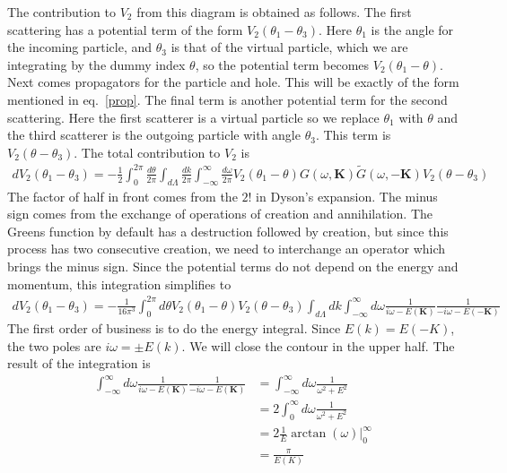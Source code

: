 \documentclass[14pt]{extarticle}
\begin{document}
The contribution to \(V_2\) from this diagram is obtained as follows. The first scattering has a potential term of the form \(V_2(\theta_1 - \theta_3)\). Here \(\theta_1\) is the angle for the incoming particle, and \(\theta_3\) is that of the virtual particle, which we are integrating by the dummy index \(\theta\), so the potential term becomes \(V_2(\theta_1 - \theta)\). Next comes propagators for the particle and hole. This will be exactly of the form mentioned in eq.~\ref{prop}. The final term is another potential term for the second scattering. Here the first scatterer is a virtual particle so we replace \(\theta_1\) with \(\theta\) and the third scatterer is the outgoing particle with angle \(\theta_3\). This term is \(V_2(\theta - \theta_3)\). The total contribution to \(V_2\) is
\begin{equation}\begin{aligned}
dV_2(\theta_1 - \theta_3) = -\frac{1}{2}\int_0^{2\pi} \frac{d\theta}{2\pi} \int_{d\Lambda}\frac{dk}{2\pi} \int_{-\infty}^\infty \frac{d\omega}{2\pi} V_2(\theta_1 - \theta) G(\omega,\mathbf{K})\tilde G(\omega,\mathbf{-K}) V_2(\theta - \theta_3)
\end{aligned}\end{equation}
The factor of half in front comes from the \(2!\) in Dyson's expansion. The minus sign comes from the exchange of operations of creation and annihilation. The Greens function by default has a destruction followed by creation, but since this process has two consecutive creation, we need to interchange an operator which brings the minus sign. Since the potential terms do not depend on the energy and momentum, this integration simplifies to
\begin{equation}\begin{aligned}
dV_2(\theta_1 - \theta_3) = -\frac{1}{16\pi^3}\int_0^{2\pi} d\theta V_2(\theta_1 - \theta)V_2(\theta - \theta_3)\int_{d\Lambda}dk \int_{-\infty}^\infty d\omega  \frac{1}{i\omega - E(\mathbf{K})}\frac{1}{-i\omega - E(\mathbf{-K})}
\end{aligned}\end{equation}
The first order of business is to do the energy integral. Since \(E(k) = E(-K)\), the two poles are  \(i\omega = \pm E(k)\). We will close the contour in the upper half. The result of the integration is
\begin{equation}\begin{aligned}
\int_{-\infty}^\infty d\omega  \frac{1}{i\omega - E(\mathbf{K})}\frac{1}{-i\omega - E(\mathbf{K})} &= \int_{-\infty}^\infty d\omega  \frac{1}{\omega^2 + E^2}\\
											       &=2 \int_0^\infty d\omega  \frac{1}{\omega^2 + E^2}\\
											       &= 2\frac{1}{E} \arctan (\omega) \bigg\vert_0^\infty\\
											       &= \frac{\pi}{E(K)}
\end{aligned}\end{equation}
\end{document}
